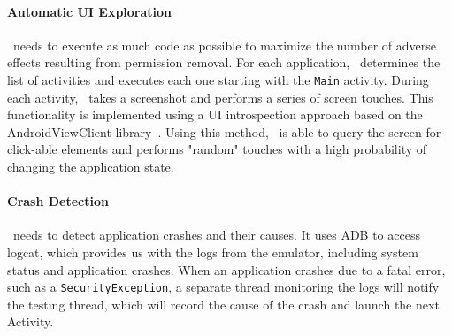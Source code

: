 \paragraph{\bfseries Automatic UI Exploration}
\toolname\ needs to execute as much code as possible to maximize the number of adverse effects resulting from permission removal.  For each application, \toolname\ determines the list of activities and executes each one starting with the \texttt{Main} activity. During each activity, \toolname\ takes a screenshot and performs a series of screen touches.  This functionality is implemented using a UI introspection approach based on the AndroidViewClient library~\cite{Milano}.  Using this method, \toolname\ is able to query the screen for click-able elements and performs "random" touches with a high probability of changing the application state.

\paragraph{\bfseries Crash Detection}
\toolname\ needs to detect application crashes and their causes.  It uses ADB to access logcat, which provides us with the logs from the emulator, including system status and application crashes.  When an application crashes due to a fatal error, such as a \texttt{SecurityException}, a separate thread monitoring the logs will notify the testing thread, which will record the cause of the crash and launch the next Activity.



